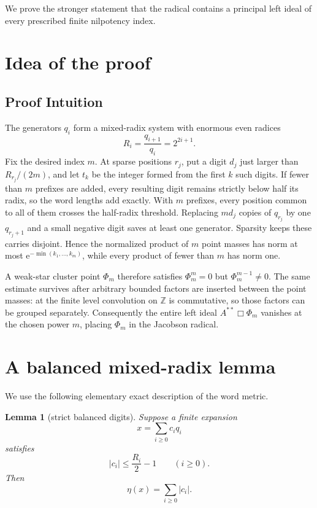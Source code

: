 \documentclass[11pt]{article}
\newtheorem{lemma}{Lemma}
\newcommand{\Z}{\mathbb Z}
\newcommand{\ee}{\mathrm e}
\begin{document}
We prove the stronger statement that the radical contains a principal left
ideal of every prescribed finite nilpotency index.

\section{Idea of the proof}

\subsection*{Proof Intuition}

The generators \(q_i\) form a mixed-radix system with enormous even radices
\[
 R_i=\frac{q_{i+1}}{q_i}=2^{2i+1}.
\]
Fix the desired index \(m\).  At sparse positions \(r_j\), put a digit
\(d_j\) just larger than \(R_{r_j}/(2m)\), and let \(t_k\) be the integer
formed from the first \(k\) such digits.  If fewer than \(m\) prefixes are
added, every resulting digit remains strictly below half its radix, so the
word lengths add exactly.  With \(m\) prefixes, every position common to all
of them crosses the half-radix threshold.  Replacing \(m d_j\) copies of
\(q_{r_j}\) by one \(q_{r_j+1}\) and a small negative digit saves at least
one generator.  Sparsity keeps these carries disjoint.  Hence the normalized
product of \(m\) point masses has norm at most
\(\ee^{-\min(k_1,\ldots,k_m)}\), while every product of fewer than \(m\)
has norm one.

A weak-star cluster point \(\Phi_m\) therefore satisfies
\(\Phi_m^m=0\) but \(\Phi_m^{m-1}\neq0\).  The same estimate survives after
arbitrary bounded factors are inserted between the point masses: at the
finite level convolution on \(\Z\) is commutative, so those factors can be
grouped separately.  Consequently the entire left ideal
\(A^{**}\Box\Phi_m\) vanishes at the chosen power \(m\), placing
\(\Phi_m\) in the Jacobson radical.

\section{A balanced mixed-radix lemma}

We use the following elementary exact description of the word metric.

\begin{lemma}[strict balanced digits]\label{lem:balanced}
Suppose a finite expansion
\[
 x=\sum_{i\geq0}c_iq_i
\]
satisfies
\[
 |c_i|\leq \frac{R_i}{2}-1\qquad(i\geq0).
\]
Then
\[
 \eta(x)=\sum_{i\geq0}|c_i|.
\]
\end{lemma}
\end{document}
